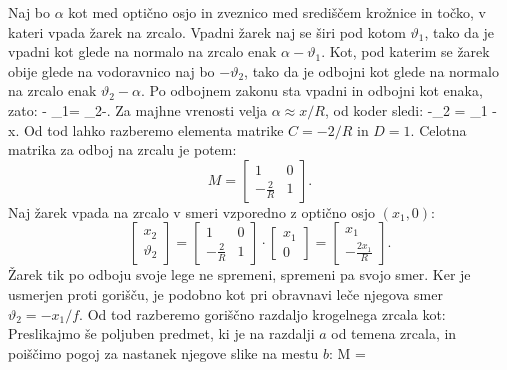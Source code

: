 Naj bo $\alpha$ kot med optično osjo in zveznico med središčem krožnice in točko, 
v kateri vpada žarek na zrcalo. Vpadni žarek naj se širi pod kotom $\vartheta_1$, tako da
je vpadni kot glede na normalo na zrcalo enak $\alpha -\vartheta_1$. Kot, pod katerim 
se žarek obije glede na vodoravnico naj bo $-\vartheta_2$, tako da je odbojni kot glede
na normalo na zrcalo enak $\vartheta_2 - \alpha$. Po odbojnem zakonu sta vpadni in odbojni
kot enaka, zato:
\beq
\alpha - \vartheta_1= \vartheta_2-\alpha.
\label{eq:02_60}
\eeq
Za majhne vrenosti velja $\alpha \approx x/R$, od koder sledi:
\beq
-\vartheta_2 = \vartheta_1 - x.
\label{eq:02_61a}
\eeq
Od tod lahko razberemo elementa matrike $C = -2/R$ in $D = 1$. Celotna matrika za odboj 
na zrcalu je potem:
\begin{equation}
 M = \left[\begin{array}{cc}
1& 0\\
-\frac{2}{R}&1
\end{array}\right]\!\!.
 \label{eq:02_62}
\end{equation}
Naj žarek vpada na zrcalo v smeri vzporedno z optično osjo $(x_1, 0)$:
\begin{equation}
\left[\begin{array}{c}
x_2\\
\vartheta_2
\end{array}\right]
= \left[\begin{array}{cc}
1& 0\\
-\frac{2}{R}&1
\end{array}\right]\cdot
\left[\begin{array}{c}
x_1\\
0
\end{array}\right] = 
\left[\begin{array}{c}
x_1\\
-\frac{2x_1}{R}
\end{array}\right]\!\!.
 \label{eq:02_63}
\end{equation}
Žarek tik po odboju svoje lege ne spremeni, spremeni pa svojo smer.
Ker je usmerjen proti gorišču, je podobno kot
pri obravnavi leče njegova smer $\vartheta_2 = -x_1/f$. 
Od tod razberemo goriščno razdaljo krogelnega zrcala kot:
Preslikajmo še poljuben predmet, ki je na razdalji $a$ od temena zrcala, in poiščimo
pogoj za nastanek njegove slike na mestu $b$:
\beq
M = 
\left[\begin{array}{cc}
1& b\\
0&1
\end{array}\right]\cdot
